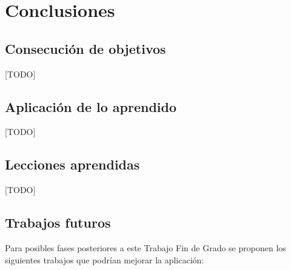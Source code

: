 \documentclass[a4paper, 12pt]{book}
\begin{document}

    \cleardoublepage


    \chapter{Conclusiones}
    \label{chap:conclusiones}


    \section{Consecución de objetivos}
    \label{sec:consecucion-objetivos}

    [TODO]


    \section{Aplicación de lo aprendido}
    \label{sec:aplicacion}

    [TODO]


    \section{Lecciones aprendidas}
    \label{sec:lecciones_aprendidas}

    [TODO]


    \section{Trabajos futuros}
    \label{sec:trabajos_futuros}

    Para posibles fases posteriores a este Trabajo Fin de Grado se proponen los siguientes trabajos que podrían mejorar la aplicación:
\end{document}

